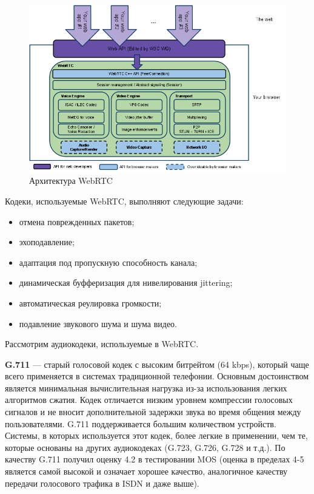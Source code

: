 \begin{figure}[h!]
  \centering
  \includegraphics[width=150mm]{pic/webrtc_architecture.png}
  \caption{Архитектура WebRTC}
  \label{pic:webrtc_architecture}
\end{figure}

Кодеки, используемые WebRTC, выполняют следующие задачи:
\begin{itemize}
\item отмена поврежденных пакетов;
\item эхоподавление;
\item адаптация под пропускную способность канала;
\item динамическая буфферизация для нивелирования jittering;
\item автоматическая реулировка громкости;
\item подавление звукового шума и шума видео.
\end{itemize}

Рассмотрим аудиокодеки, используемые в WebRTC.

\textbf{G.711} --- старый голосовой кодек с высоким битрейтом (64 kbps), 
который чаще всего применяется в системах традиционной телефонии. 
Основным достоинством является минимальная вычислительная нагрузка 
из-за использования легких алгоритмов сжатия.
Кодек отличается низким уровнем компрессии голосовых сигналов
и не вносит дополнительной задержки звука во время общения между пользователями.
G.711 поддерживается большим количеством устройств. 
Системы, в которых используется этот кодек, более легкие в применении, 
чем те, которые основаны на других аудиокодеках (G.723, G.726, G.728 и т.д.). 
По качеству G.711 получил оценку 4.2 в тестировании MOS 
(оценка в пределах 4-5 является самой высокой и означает хорошее качество, 
аналогичное качеству передачи голосового трафика в ISDN и даже выше).

